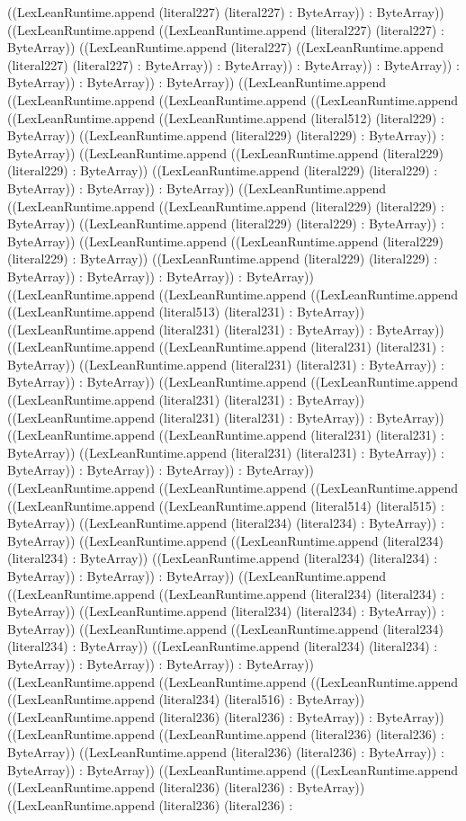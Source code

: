 \documentclass[11pt]{article}
\begin{document}
((LexLeanRuntime.append (literal227) (literal227) : ByteArray)) : ByteArray)) ((LexLeanRuntime.append ((LexLeanRuntime.append (literal227) (literal227) : ByteArray)) ((LexLeanRuntime.append (literal227) ((LexLeanRuntime.append (literal227) (literal227) : ByteArray)) : ByteArray)) : ByteArray)) : ByteArray)) : ByteArray)) : ByteArray)) : ByteArray)) ((LexLeanRuntime.append ((LexLeanRuntime.append ((LexLeanRuntime.append ((LexLeanRuntime.append ((LexLeanRuntime.append ((LexLeanRuntime.append (literal512) (literal229) : ByteArray)) ((LexLeanRuntime.append (literal229) (literal229) : ByteArray)) : ByteArray)) ((LexLeanRuntime.append ((LexLeanRuntime.append (literal229) (literal229) : ByteArray)) ((LexLeanRuntime.append (literal229) (literal229) : ByteArray)) : ByteArray)) : ByteArray)) ((LexLeanRuntime.append ((LexLeanRuntime.append ((LexLeanRuntime.append (literal229) (literal229) : ByteArray)) ((LexLeanRuntime.append (literal229) (literal229) : ByteArray)) : ByteArray)) ((LexLeanRuntime.append ((LexLeanRuntime.append (literal229) (literal229) : ByteArray)) ((LexLeanRuntime.append (literal229) (literal229) : ByteArray)) : ByteArray)) : ByteArray)) : ByteArray)) ((LexLeanRuntime.append ((LexLeanRuntime.append ((LexLeanRuntime.append ((LexLeanRuntime.append (literal513) (literal231) : ByteArray)) ((LexLeanRuntime.append (literal231) (literal231) : ByteArray)) : ByteArray)) ((LexLeanRuntime.append ((LexLeanRuntime.append (literal231) (literal231) : ByteArray)) ((LexLeanRuntime.append (literal231) (literal231) : ByteArray)) : ByteArray)) : ByteArray)) ((LexLeanRuntime.append ((LexLeanRuntime.append ((LexLeanRuntime.append (literal231) (literal231) : ByteArray)) ((LexLeanRuntime.append (literal231) (literal231) : ByteArray)) : ByteArray)) ((LexLeanRuntime.append ((LexLeanRuntime.append (literal231) (literal231) : ByteArray)) ((LexLeanRuntime.append (literal231) (literal231) : ByteArray)) : ByteArray)) : ByteArray)) : ByteArray)) : ByteArray)) ((LexLeanRuntime.append ((LexLeanRuntime.append ((LexLeanRuntime.append ((LexLeanRuntime.append ((LexLeanRuntime.append (literal514) (literal515) : ByteArray)) ((LexLeanRuntime.append (literal234) (literal234) : ByteArray)) : ByteArray)) ((LexLeanRuntime.append ((LexLeanRuntime.append (literal234) (literal234) : ByteArray)) ((LexLeanRuntime.append (literal234) (literal234) : ByteArray)) : ByteArray)) : ByteArray)) ((LexLeanRuntime.append ((LexLeanRuntime.append ((LexLeanRuntime.append (literal234) (literal234) : ByteArray)) ((LexLeanRuntime.append (literal234) (literal234) : ByteArray)) : ByteArray)) ((LexLeanRuntime.append ((LexLeanRuntime.append (literal234) (literal234) : ByteArray)) ((LexLeanRuntime.append (literal234) (literal234) : ByteArray)) : ByteArray)) : ByteArray)) : ByteArray)) ((LexLeanRuntime.append ((LexLeanRuntime.append ((LexLeanRuntime.append ((LexLeanRuntime.append (literal234) (literal516) : ByteArray)) ((LexLeanRuntime.append (literal236) (literal236) : ByteArray)) : ByteArray)) ((LexLeanRuntime.append ((LexLeanRuntime.append (literal236) (literal236) : ByteArray)) ((LexLeanRuntime.append (literal236) (literal236) : ByteArray)) : ByteArray)) : ByteArray)) ((LexLeanRuntime.append ((LexLeanRuntime.append ((LexLeanRuntime.append (literal236) (literal236) : ByteArray)) ((LexLeanRuntime.append (literal236) (literal236) : 
\end{document}

